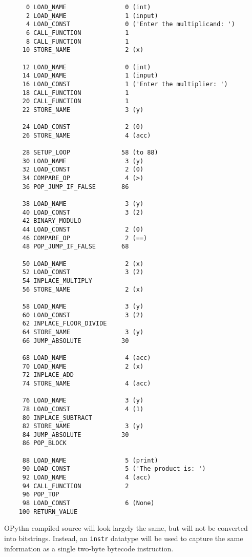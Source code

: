 \documentclass[11pt, twoside]{article}
\begin{document}
    \begin{lstlisting}
      0 LOAD_NAME                0 (int)
      2 LOAD_NAME                1 (input)
      4 LOAD_CONST               0 ('Enter the multiplicand: ')
      6 CALL_FUNCTION            1
      8 CALL_FUNCTION            1
     10 STORE_NAME               2 (x)

     12 LOAD_NAME                0 (int)
     14 LOAD_NAME                1 (input)
     16 LOAD_CONST               1 ('Enter the multiplier: ')
     18 CALL_FUNCTION            1
     20 CALL_FUNCTION            1
     22 STORE_NAME               3 (y)

     24 LOAD_CONST               2 (0)
     26 STORE_NAME               4 (acc)

     28 SETUP_LOOP              58 (to 88)
     30 LOAD_NAME                3 (y)
     32 LOAD_CONST               2 (0)
     34 COMPARE_OP               4 (>)
     36 POP_JUMP_IF_FALSE       86

     38 LOAD_NAME                3 (y)
     40 LOAD_CONST               3 (2)
     42 BINARY_MODULO
     44 LOAD_CONST               2 (0)
     46 COMPARE_OP               2 (==)
     48 POP_JUMP_IF_FALSE       68

     50 LOAD_NAME                2 (x)
     52 LOAD_CONST               3 (2)
     54 INPLACE_MULTIPLY
     56 STORE_NAME               2 (x)

     58 LOAD_NAME                3 (y)
     60 LOAD_CONST               3 (2)
     62 INPLACE_FLOOR_DIVIDE
     64 STORE_NAME               3 (y)
     66 JUMP_ABSOLUTE           30

     68 LOAD_NAME                4 (acc)
     70 LOAD_NAME                2 (x)
     72 INPLACE_ADD
     74 STORE_NAME               4 (acc)

     76 LOAD_NAME                3 (y)
     78 LOAD_CONST               4 (1)
     80 INPLACE_SUBTRACT
     82 STORE_NAME               3 (y)
     84 JUMP_ABSOLUTE           30
     86 POP_BLOCK

     88 LOAD_NAME                5 (print)
     90 LOAD_CONST               5 ('The product is: ')
     92 LOAD_NAME                4 (acc)
     94 CALL_FUNCTION            2
     96 POP_TOP
     98 LOAD_CONST               6 (None)
    100 RETURN_VALUE
    \end{lstlisting}
    OPythn compiled source will look largely the same, but will not be converted into bitstrings. Instead, an \texttt{instr} datatype will be used to capture the same information as a single two-byte bytecode instruction.
\end{document}
